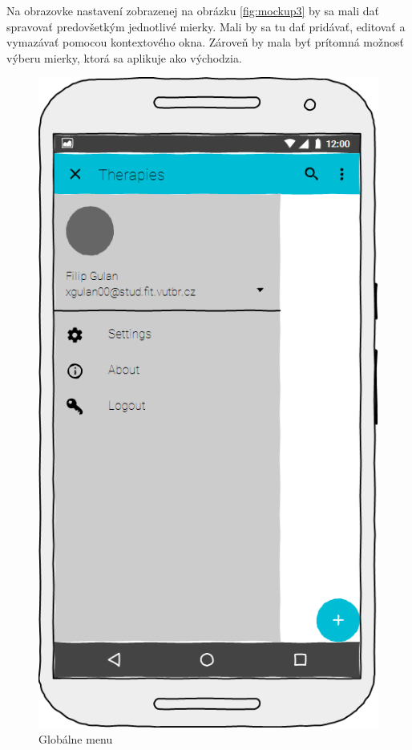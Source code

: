 Na obrazovke nastavení zobrazenej na obrázku \ref{fig:mockup3} by sa mali dať spravovať predovšetkým jednotlivé mierky. Mali by sa tu dať pridávať, editovať a vymazávať pomocou kontextového okna. Zároveň by mala byť prítomná možnosť výberu mierky, ktorá sa aplikuje ako východzia.
\begin{figure}[h]
   \begin{minipage}{0.48\textwidth}
     \centering
     \includegraphics[scale=0.45]{fig/mockup2.png}
      \caption{Globálne menu}
      \label{fig:mockup2}
   \end{minipage}\hfill

\end{figure}
